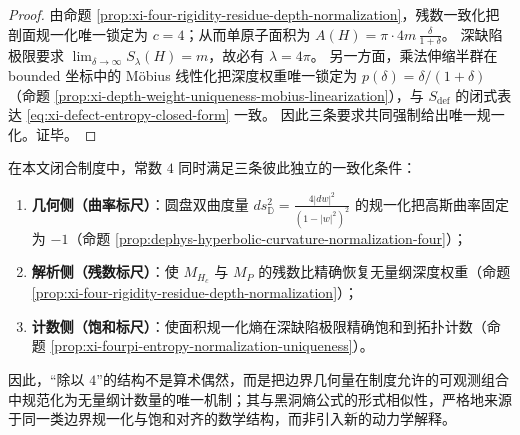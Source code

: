 \begin{proof}
由命题 \ref{prop:xi-four-rigidity-residue-depth-normalization}，残数一致化把剖面规一化唯一锁定为 \(c=4\)；从而单原子面积为
\(
A(H)=\pi\cdot 4m\,\frac{\delta}{1+\delta}
\)。
深缺陷极限要求 \(\lim_{\delta\to\infty}S_\lambda(H)=m\)，故必有 \(\lambda=4\pi\)。
另一方面，乘法伸缩半群在 bounded 坐标中的 Möbius 线性化把深度权重唯一锁定为
\(
p(\delta)=\delta/(1+\delta)
\)
（命题 \ref{prop:xi-depth-weight-uniqueness-mobius-linearization}），与 \(S_{\mathrm{def}}\) 的闭式表达 \eqref{eq:xi-defect-entropy-closed-form} 一致。
因此三条要求共同强制给出唯一规一化。证毕。
\end{proof}

\begin{remark}\label{rem:xi-four-triple-consistency-curvature-residue-saturation}
在本文闭合制度中，常数 \(4\) 同时满足三条彼此独立的一致化条件：
\begin{enumerate}
  \item \textbf{几何侧（曲率标尺）}：圆盘双曲度量 \(ds^2_{\mathbb D}=\frac{4|dw|^2}{(1-|w|^2)^2}\) 的规一化把高斯曲率固定为 \(-1\)（命题 \ref{prop:dephys-hyperbolic-curvature-normalization-four}）；
  \item \textbf{解析侧（残数标尺）}：使 \(M_{H_c}\) 与 \(M_P\) 的残数比精确恢复无量纲深度权重（命题 \ref{prop:xi-four-rigidity-residue-depth-normalization}）；
  \item \textbf{计数侧（饱和标尺）}：使面积规一化熵在深缺陷极限精确饱和到拓扑计数（命题 \ref{prop:xi-fourpi-entropy-normalization-uniqueness}）。
\end{enumerate}
因此，“除以 \(4\)”的结构不是算术偶然，而是把边界几何量在制度允许的可观测组合中规范化为无量纲计数量的唯一机制；其与黑洞熵公式的形式相似性，严格地来源于同一类边界规一化与饱和对齐的数学结构，而非引入新的动力学解释。
\end{remark}
